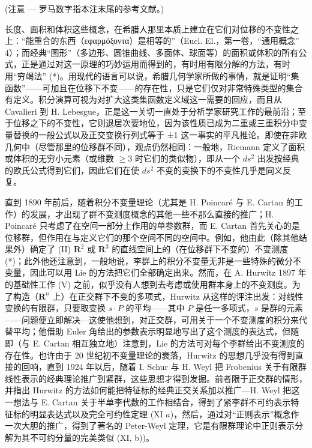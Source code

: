 \relax{}
(注意 --- 罗马数字指本注末尾的参考文献。)

长度、面积和体积这些概念，在希腊人那里本质上建立在它们对位移的不变性之上：“能重合的东西（εφαρμόξοντα）是相等的”（Eucl. El.，第一卷，“通用概念” 4）；而经典“图形”（多边形、圆锥曲线、多面体、球面等）的面积或体积的所有公式，正是通过对这一原理的巧妙运用而得到的，有时用有限分解的方法，有时用“穷竭法” (*)。用现代的语言可以说，希腊几何学家所做的事情，就是证明“集函数”——可加且在位移下不变——的存在性，只是它们仅对非常特殊类型的集合有定义。积分演算可视为对扩大这类集函数定义域这一需要的回应，而且从 Cavalieri 到 H. Lebesgue，正是这一关切一直处于分析学家研究工作的最前沿；至于位移之下的不变性，它则退居次要地位，因为该性质已成为二重或三重积分中变量替换的一般公式以及正交变换行列式等于 ±1 这一事实的平凡推论。即使在非欧几何中（尽管那里的位移群不同），观点仍然相同：一般地，Riemann 定义了面积或体积的无穷小元素（或维数 \(\geqslant3\) 时它们的类似物），即从一个 \(ds^{2}\) 出发按经典的欧氏公式得到它们，因此它们在使 \(ds^{2}\) 不变的变换下的不变性几乎是同义反复。

直到 1890 年前后，随着积分不变量理论（尤其是 H. Poincaré 与 E. Cartan 的工作）的发展，才出现了群不变测度概念的其他一些不那么直接的推广；H. Poincaré 只考虑了在空间一部分上作用的单参数群，而 E. Cartan 首先关心的是位移群，但作用在与定义它们的那个空间不同的空间中。例如，他由此（除其他结果外）确定了 (II) \(\mathbf{R}^2\) 或 \(\mathbf{R}^3\) 的直线空间上的（在位移群下不变的）不变测度 (*)；此外他还注意到，一般地说，李群上的积分不变量无非是一些特殊的微分不变量，因此可以用 Lie 的方法把它们全部确定出来。然而，在 A. Hurwitz 1897 年的基础性工作 (V) 之前，似乎没有人想到去考虑或使用群本身上的不变测度。为了构造（\(\mathbf{R}^n\) 上）在正交群下不变的多项式，Hurwitz 从这样的评注出发：对线性变换的有限群，只要取变换 \(s \cdot P\) 的平均——其中 \(P\) 是任一多项式，\(s\) 是群的元素——问题便立即解决---这使他想到，对正交群，可用关于一个不变测度的积分来代替平均；他借助 Euler 角给出的参数表示明显地写出了这个测度的表达式，但随即（与 E. Cartan 相互独立地）注意到，Lie 的方法可对每个李群给出不变测度的存在性。也许由于 20 世纪初不变量理论的衰落，Hurwitz 的思想几乎没有得到直接的回响，直到 1924 年以后，随着 I. Schur 与 H. Weyl 把 Frobenius 关于有限群线性表示的经典理论推广到紧群，这些思想才得到发掘。前者限于正交群的情形，并指出 Hurwitz 的方法如何能把特征标的经典正交关系加以推广---H. Weyl 把这一想法与 E. Cartan 关于半单李代数的工作相结合，得到了紧李群不可约表示特征标的明显表达式以及完全可约性定理 (XI \(a\))，然后，通过对“正则表示”概念作一次大胆的推广，得到了著名的 Peter-Weyl 定理，它是有限群理论中正则表示分解为其不可约分量的完美类似 (XI, b))。

